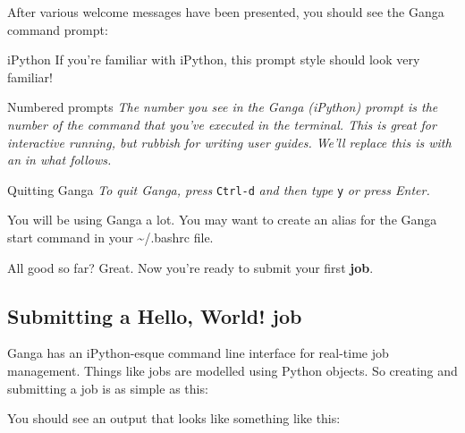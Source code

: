After various welcome messages have been presented, you should see the
Ganga command prompt:

\begin{Shaded}
\begin{Highlighting}[]
 
\end{Highlighting}
\end{Shaded}

\begin{infobox}{iPython}
If you're familiar with iPython, this prompt style should look very
familiar!
\end{infobox}

\begin{hintbox}{Numbered prompts}
\emph{The number you see in the Ganga (iPython) prompt is the number of the
command that you've executed in the terminal. This is great for
interactive running, but rubbish for writing user guides. We'll replace
this is with an}  \emph{in what follows.}
\end{hintbox}

\begin{hintbox}{Quitting Ganga}
\emph{To quit Ganga, press}
\texttt{Ctrl-d}
\emph{and then type}
\texttt{y}
\emph{or press Enter.}
\end{hintbox}

You will be using Ganga a lot. You may want to create an alias for the
Ganga start command in your \textasciitilde{}/.bashrc file.

All good so far? Great. Now you're ready to submit your first
\textbf{job}.

\subsection{Submitting a Hello, World!
job}\label{submitting-a-hello-world-job}

Ganga has an iPython-esque command line interface for real-time job
management. Things like jobs are modelled using Python objects. So
creating and submitting a job is as simple as this:

\begin{Shaded}
\begin{Highlighting}[]
 
 
\end{Highlighting}
\end{Shaded}

You should see an output that looks like something like this:

